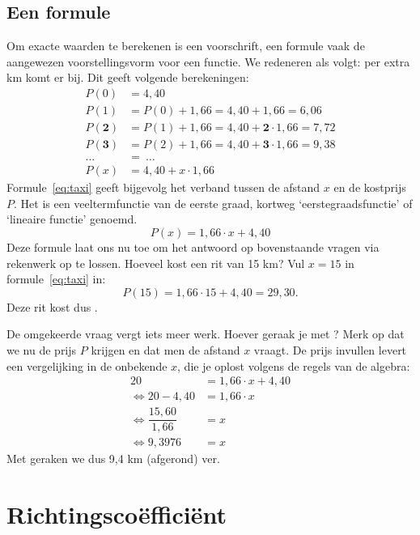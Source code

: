 \subsection{Een formule}
Om exacte waarden te berekenen is een voorschrift, een formule vaak de aangewezen voorstellingsvorm voor een functie. We redeneren als volgt: per extra km komt er  bij. Dit geeft volgende berekeningen:
\begin{align*}
P(0)&=4,40\\
P(1)&=P(0)+1,66=4,40+1,66=6,06\\
P(\mathbf{2})&=P(1)+1,66=4,40+\mathbf{2}\cdot 1,66=7,72\\
P(\mathbf{3})&=P(2)+1,66=4,40+\mathbf{3}\cdot 1,66= 9,38\\
\ldots \ &=\ \ldots \\
P(x)&=4,40+x\cdot 1,66
\end{align*}
Formule~\ref{eq:taxi} geeft bijgevolg het verband tussen de afstand $x$ en de kostprijs $P$. Het is een veeltermfunctie van de eerste graad, kortweg `eerstegraadsfunctie' of `lineaire functie' genoemd.
\begin{equation}\label{eq:taxi}
P(x)=1,66\cdot x + 4,40
\end{equation}
Deze formule laat ons nu toe om het antwoord op bovenstaande vragen via rekenwerk op te lossen. Hoeveel kost een rit van 15 km? Vul $x=15$ in formule~\eqref{eq:taxi} in:
\[
P(15)=1,66\cdot 15 + 4,40=29,30.
\]
Deze rit kost dus .

De omgekeerde vraag vergt iets meer werk. Hoever geraak je met ? Merk op dat we nu de prijs $P$ krijgen en dat men de afstand $x$ vraagt. De prijs invullen levert een vergelijking in de onbekende $x$, die je oplost volgens de regels van de algebra:
\begin{align*}
20&=1,66\cdot x + 4,40\\
\Leftrightarrow 20-4,40&=1,66 \cdot x\\
\Leftrightarrow \dfrac{15,60}{1,66}&=x\\
\Leftrightarrow 9,3976 &= x
\end{align*}
Met  geraken we dus 9,4 km (afgerond) ver.

\section{Richtingscoëfficiënt}
